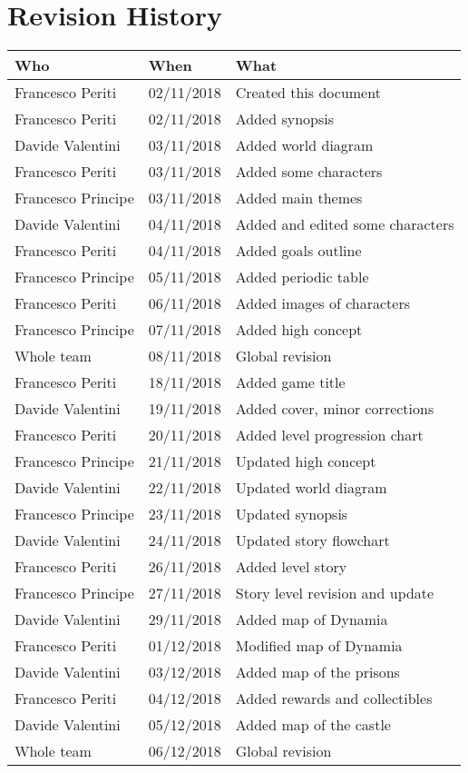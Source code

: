 \chapter*{Revision History}

\begin{longtable}[H]{|l|l|l|}
\hline
\cellcolor{lightgray}\textbf{Who} & \cellcolor{lightgray}\textbf{When} & \cellcolor{lightgray}\textbf{What} \\ \hline
Francesco Periti & 02/11/2018 & Created this document \\ \hline
Francesco Periti & 02/11/2018 & Added synopsis \\ \hline
Davide Valentini & 03/11/2018 & Added world diagram \\ \hline
Francesco Periti & 03/11/2018 & Added some characters \\ \hline
Francesco Principe & 03/11/2018 & Added main themes \\ \hline
Davide Valentini & 04/11/2018 & Added and edited some characters \\ \hline
Francesco Periti & 04/11/2018 & Added goals outline \\ \hline
Francesco Principe & 05/11/2018 & Added periodic table \\ \hline
Francesco Periti & 06/11/2018 & Added images of characters \\ \hline
Francesco Principe & 07/11/2018 & Added high concept \\ \hline
Whole team & 08/11/2018 & Global revision \\ \hline

Francesco Periti & 18/11/2018 & Added game title \\ \hline
Davide Valentini & 19/11/2018 & Added cover, minor corrections \\ \hline
Francesco Periti & 20/11/2018 & Added level progression chart \\ \hline
Francesco Principe & 21/11/2018 & Updated high concept \\ \hline
Davide Valentini & 22/11/2018 & Updated world diagram \\ \hline
Francesco Principe & 23/11/2018 & Updated synopsis \\ \hline
Davide Valentini & 24/11/2018 & Updated story flowchart \\ \hline
Francesco Periti & 26/11/2018 & Added level story \\ \hline
Francesco Principe & 27/11/2018 & Story level revision and update \\ \hline
Davide Valentini & 29/11/2018 & Added map of Dynamia \\ \hline
Francesco Periti & 01/12/2018 & Modified map of Dynamia \\ \hline
Davide Valentini & 03/12/2018 & Added map of the prisons \\ \hline
Francesco Periti & 04/12/2018 & Added rewards and collectibles \\ \hline
Davide Valentini & 05/12/2018 & Added map of the castle \\ \hline
Whole team & 06/12/2018 & Global revision \\ \hline


\end{longtable}
